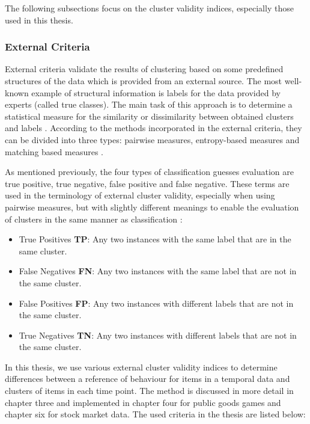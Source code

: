 The following subsections focus on the cluster validity indices, especially those used in this thesis.

\subsubsection{External Criteria}
External criteria validate the results of clustering based on some predefined structures of the data which is provided from an external source. The most well-known example of structural information is labels for the data provided by experts (called true classes). The main task of this approach is to determine a statistical measure for the similarity or dissimilarity between obtained clusters and labels \cite{Halkidi2002a, Rendon2011}. According to the methods incorporated in the external criteria, they can be divided into three types: pairwise measures, entropy-based measures and matching based measures \cite{Zaki2014}. 

As mentioned previously, the four types of classification guesses evaluation are true positive, true negative, false positive and false negative. These terms are used in the terminology of external cluster validity, especially when using pairwise measures, but with slightly different meanings to enable the evaluation of clusters in the same manner as classification \cite{Zaki2014}:
\begin{itemize}
    \item True Positives \textbf{TP}: Any two instances with the same label that are in the same cluster.
    
    \item False Negatives \textbf{FN}: Any two instances with the same label that are not in the same cluster.
    
    \item False Positives \textbf{FP}: Any two instances with different labels that are not in the same cluster.
    
    \item True Negatives \textbf{TN}: Any two instances with different labels that are not in the same cluster.
    
\end{itemize}

In this thesis, we use various external cluster validity indices to determine differences between a reference of behaviour for items in a temporal data and clusters of items in each time point. The method is discussed in more detail in chapter three and implemented in chapter four for public goods games and chapter six for stock market data. The used criteria in the thesis are listed below:

